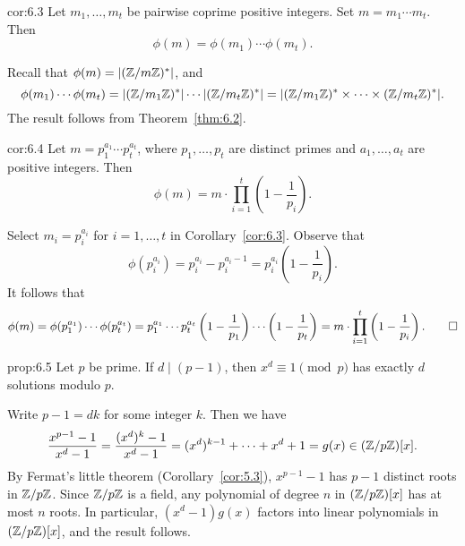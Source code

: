 \begin{cor}{cor:6.3}
    Let $m_1, \dots, m_t$ be pairwise coprime positive integers. Set 
    $m = m_1 \cdots m_t$. Then 
    \[ \phi(m) = \phi(m_1) \cdots \phi(m_t). \] 
\end{cor}
\begin{pf}
    Recall that $\phi(m) = |(\mathbb{Z}/m\mathbb{Z})^*|$, and 
    \[ \phi(m_1) \cdots \phi(m_t) = |(\mathbb{Z}/m_1\mathbb{Z})^*| \cdots |(\mathbb{Z}/m_t\mathbb{Z})^*| 
    = |(\mathbb{Z}/m_1\mathbb{Z})^* \times \cdots \times (\mathbb{Z}/m_t\mathbb{Z})^*|. \] 
    The result follows from Theorem~\ref{thm:6.2}. 
\end{pf}

\begin{cor}{cor:6.4}
    Let $m = p_1^{a_1} \cdots p_t^{a_t}$, where $p_1, \dots, p_t$ are distinct 
    primes and $a_1, \dots, a_t$ are positive integers. Then 
    \[ \phi(m) = m \cdot \prod_{i=1}^t \left( 1 - \frac{1}{p_i} \right). \] 
\end{cor}
\begin{pf}
    Select $m_i = p_i^{a_i}$ for $i = 1, \dots, t$ in Corollary~\ref{cor:6.3}. 
    Observe that 
    \[ \phi(p_i^{a_i}) = p_i^{a_i} - p_i^{a_i-1} = p_i^{a_i} \left( 1 - 
    \frac{1}{p_i} \right). \] 
    It follows that 
    \[ \phi(m) = \phi(p_1^{a_1}) \cdots \phi(p_t^{a_t}) = 
    p_1^{a_1} \cdots p_t^{a_t} \left( 1 - \frac{1}{p_1} \right) 
    \cdots \left( 1 - \frac{1}{p_t} \right) = m \cdot \prod_{i=1}^t 
    \left( 1 - \frac{1}{p_i} \right). \qedhere \] 
\end{pf}

\begin{prop}{prop:6.5} 
    Let $p$ be prime. If $d \mid (p-1)$, then $x^d \equiv 1 \pmod p$ has exactly 
    $d$ solutions modulo $p$. 
\end{prop}
\begin{pf}
    Write $p-1 = dk$ for some integer $k$. Then we have 
    \[ \frac{x^{p-1}-1}{x^d-1} = \frac{(x^d)^k-1}{x^d-1} = (x^d)^{k-1} 
    + \cdots + x^d + 1 = g(x) \in (\mathbb{Z}/p\mathbb{Z})[x]. \] 
    By Fermat's little theorem (Corollary~\ref{cor:5.3}), $x^{p-1}-1$ has 
    $p-1$ distinct roots in $\mathbb{Z}/p\mathbb{Z}$. Since $\mathbb{Z}/p\mathbb{Z}$ is a field, any 
    polynomial of degree $n$ in $(\mathbb{Z}/p\mathbb{Z})[x]$ has at most $n$ roots. In particular, 
    $(x^d-1)g(x)$ factors into linear polynomials in $(\mathbb{Z}/p\mathbb{Z})[x]$, and the 
    result follows. 
\end{pf}

